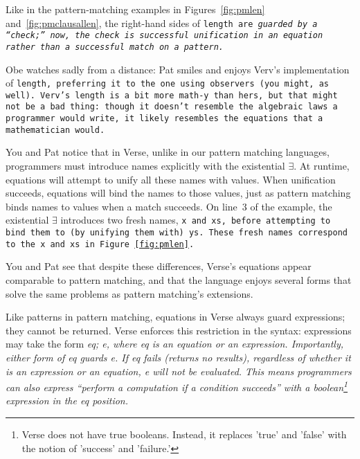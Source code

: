 \documentclass[manuscript,screen,review, 12pt]{acmart}
\begin{document}
    Like in the pattern-matching examples in Figures~\ref{fig:pmlen}
    and~\ref{fig:pmclausallen}, the right-hand sides of \tt{length} are
    \it{guarded} by a “check;” now, the check is successful unification in an
    equation rather than a successful match on a pattern. 

    Obe watches sadly from a distance: Pat smiles and enjoys Verv's
    implementation of \tt{length}, preferring it to the one using observers (you
    might, as well). Verv's \tt{length} is a bit more math-y than hers, but that
    might not be a bad thing: though it doesn't resemble the algebraic laws a
    programmer would write, it likely resembles the equations that a
    mathematician would. 

    
    
    
    You and Pat notice that in Verse, unlike in our pattern matching languages,
    programmers must introduce names explicitly with the existential $\exists$.
    At runtime, equations will attempt to unify all these names with values.
    When unification succeeds, equations will bind the names to those values,
    just as pattern matching binds names to values when a match succeeds. On
    line~3 of the example, the existential $\exists$ introduces two fresh names,
    \tt{x} and \tt{xs}, before attempting to bind them to (by unifying them
    with) \tt{ys}. These fresh names correspond to the \tt{x} and \tt{xs} in
    Figure \ref{fig:pmlen}. 

    You and Pat see that despite these differences, Verse's equations appear
    comparable to pattern matching, and that the language enjoys several forms
    that solve the same problems as pattern matching's extensions. 

    

    Like patterns in pattern matching, equations in Verse always guard
    expressions; they cannot be returned. Verse enforces this restriction in the
    syntax: expressions may take the form \it{eq; e}, where \it{eq} is an
    equation or an expression. Importantly, either form of \it{eq} guards {e}.
    If \it{eq} fails (returns no results), regardless of whether it is an
    expression or an equation, \it{e} will not be evaluated. This means
    programmers can also express “perform a computation if a condition succeeds”
    with a boolean\footnote{Verse does not have true booleans. Instead, it
    replaces 'true' and 'false' with the notion of 'success' and 'failure.'}
    expression in the \it{eq} position. 

    
\end{document}
